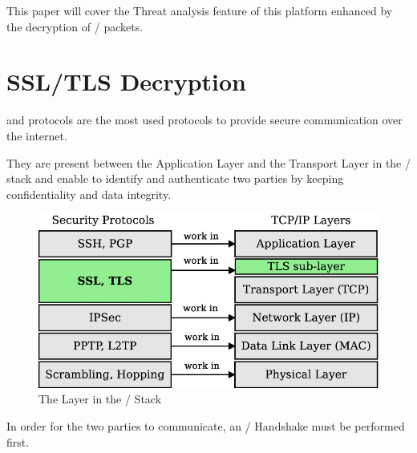 This paper will cover the Threat analysis feature of this platform enhanced by the decryption of / packets.

\newpage

\section{SSL/TLS Decryption}

 and  protocols are the most used protocols to provide secure communication over the internet.

They are present between the Application Layer and the Transport Layer in the / stack and enable to identify and authenticate two parties by keeping confidentiality and data integrity.

\begin{figure}[!hb]
    \centering
    \includegraphics[width=13cm]{img/ssl-stack.png}
    \caption{The  Layer in the / Stack}
    \label{SSL Layer}
\end{figure}


\newpage

In order for the two parties to communicate, an / Handshake must be performed first.


